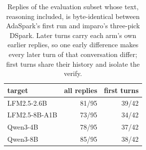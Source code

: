 \begin{table}[t]
\centering\small
\caption{Replies of the evaluation subset whose text, reasoning included, is byte-identical between AdaSpark's first run and imparo's three-pick DSpark. Later turns carry each arm's own earlier replies, so one early difference makes every later turn of that conversation differ; first turns share their history and isolate the verify.}
\label{tab:agree}
\setlength{\tabcolsep}{4pt}
\begin{tabular}{lrr}
\toprule
\rowcolor{head}\textbf{target} & \textbf{all replies} & \textbf{first turns} \\
\midrule
LFM2.5-2.6B & 81/95 & 39/42 \\
LFM2.5-8B-A1B & 73/95 & 34/42 \\
Qwen3-4B & 78/95 & 37/42 \\
Qwen3-8B & 85/95 & 38/42 \\
\bottomrule
\end{tabular}
\end{table}
